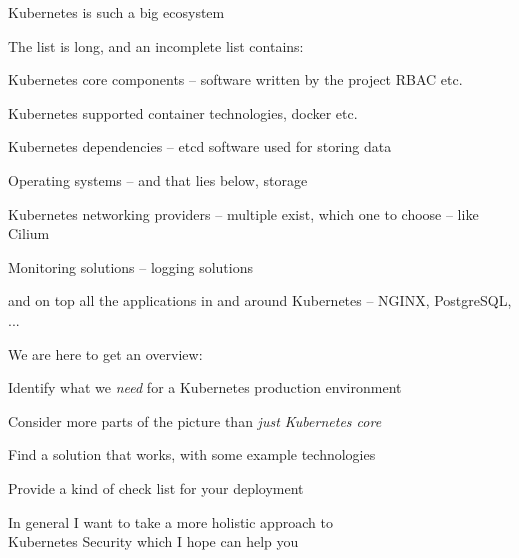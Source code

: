 \documentclass[Screen16to9,17pt]{foils}
\begin{document}
\begin{list1}
\item Kubernetes is such a big ecosystem
\item The list is long, and an incomplete list contains:
\begin{list2}
\item Kubernetes core components -- software written by the project RBAC etc.
\item Kubernetes supported container technologies, docker etc.
\item Kubernetes dependencies -- etcd software used for storing data
\item Operating systems -- and that lies below, storage
\item Kubernetes networking providers -- multiple exist, which one to choose -- like Cilium
\item Monitoring solutions -- logging solutions
\end{list2}
\item and on top all the applications in and around Kubernetes -- NGINX, PostgreSQL, ...
\end{list1}


We are here to get an overview:
\begin{list2}
\item Identify what we \emph{need} for a Kubernetes production environment
\item Consider more parts of the picture than \emph{just Kubernetes core}
\item Find a solution that works, with some example technologies
\item Provide a kind of check list for your deployment
\end{list2}

\vskip 5mm
\begin{center}
In general I want to take a more holistic approach to\\
Kubernetes Security which I hope can help you
\end{center}


\end{document}

